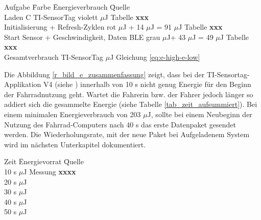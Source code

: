 \begin{minipage}{\textwidth}
    \begin{tabbing}
    Aufgabe \hspace{6 cm} \quad\=  Farbe \quad\= Energieverbrauch \hspace{1cm} \quad\= Quelle \\[0.8ex]
    Laden C TI-SensorTag  \> violett       $\mu$J    \> Tabelle \textbf{xxx}\\
    Initialisierung + Refresh-Zyklen \> rot  $\mu$J + 14 $\mu$J = 91 $\mu$J \> Tabelle \textbf{xxx}\\
    Start Sensor + Geschwindigkeit, Daten BLE\> grau  $\mu$J+ 43 $\mu$J = 49 $\mu$J    \> Tabelle \textbf{xxx}\\
    Gesamtverbrauch TI-SensorTag     \>      $\mu$J    \> Gleichung \ref{eq:e-high-e-low}\\
    \end{tabbing}
\end{minipage}


Die Abbildung \ref{r_bild_e_zusammenfassung} zeigt, dass bei der TI-Sensortag-Applikation V4 (siehe ) innerhalb von 10 s nicht genug Energie für den Beginn der Fahrradnutzung geht. Wartet die Fahrerin bzw. der Fahrer jedoch länger so addiert sich die gesammelte Energie (siehe Tabelle \ref{tab_zeit_aufsummiert}). Bei einem minimalen Energieverbrauch von 203 $\mu$J, sollte bei einem Neubeginn der Nutzung des Fahrrad-Computers nach 40 s das erste Datenpaket gesendet werden. Die Wiederholungsrate, mit der neue Paket bei Aufgeladenem System wird im nächsten Unterkapitel dokumentiert.

\begin{minipage}{\textwidth}
\label{tab_zeit_aufsummiert}
    \begin{tabbing}
    Zeit  \quad\=  Energievorrat \quad\= Quelle\\[0.8ex]
    10 s   $\mu$J   \>  Messung \textbf{xxxx} \\
    20 s   $\mu$J  \> \\
    30 s   $\mu$J  \> \\
    40 s   $\mu$J  \> \\
    50 s   $\mu$J  \> \\
    \end{tabbing}
\end{minipage}

